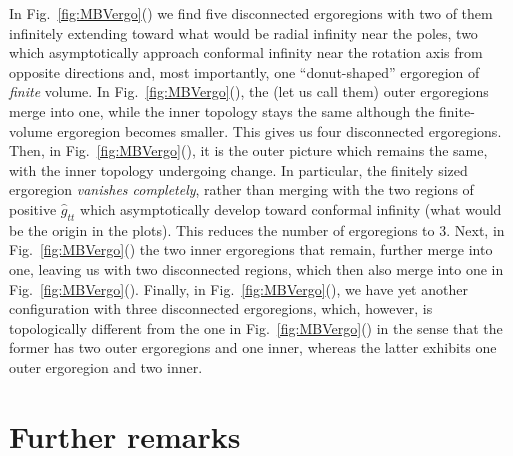 \documentclass[aps,preprint,groupedaddress,nofootinbib,superscriptaddress,showkeys,showpacs,eqsecnum,amsmath,amssymb]{revtex4-1}
\begin{document}
In Fig.~\ref{fig:MBVergo}() we find five disconnected ergoregions with two of them infinitely extending toward what would be radial infinity near the poles, two which asymptotically approach conformal infinity near the rotation axis from opposite directions and, most importantly, one ``donut-shaped'' ergoregion of \emph{finite} volume. In Fig.~\ref{fig:MBVergo}(), the (let us call them) outer ergoregions merge into one, while the inner topology stays the same although the finite-volume ergoregion becomes smaller. This gives us four disconnected ergoregions. Then, in Fig.~\ref{fig:MBVergo}(), it is the outer picture which remains the same, with the inner topology undergoing change. In particular, the finitely sized ergoregion \emph{vanishes completely}, rather than merging with the two regions of positive $\hat{g}_{tt}$ which asymptotically develop toward conformal infinity (what would be the origin in the plots). This reduces the number of ergoregions to $3$. Next, in Fig.~\ref{fig:MBVergo}() the two inner ergoregions that remain, further merge into one, leaving us with two disconnected regions, which then also merge into one in Fig.~\ref{fig:MBVergo}(). Finally, in Fig.~\ref{fig:MBVergo}(), we have yet another configuration with three disconnected ergoregions, which, however, is topologically different from the one in Fig.~\ref{fig:MBVergo}() in the sense that the former has two outer ergoregions and one inner, whereas the latter exhibits one outer ergoregion and two inner. 


\section{Further remarks} 

\end{document}
